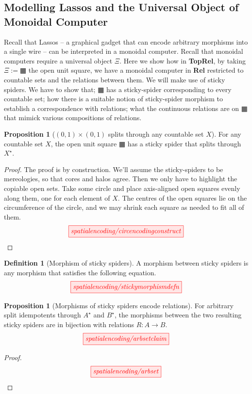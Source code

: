 \documentclass{tufte-handout}
\theoremstyle{definition}
\newtheorem{proposition}[theorem]{Proposition}
\newtheorem{defn}[theorem]{Definition}
\begin{document}
\begin{fullwidth}
\section{Modelling Lassos and the Universal Object of Monoidal Computer}

Recall that Lassos -- a graphical gadget that can encode arbitrary morphisms into a single wire -- can be interpreted in a monoidal computer. Recall that monoidal computers require a universal object $\Xi$. Here we show how in \textbf{TopRel}, by taking $\Xi := \squarehvfill$ the open unit square, we have a monoidal computer in \textbf{Rel} restricted to countable sets and the relations between them. We will make use of sticky spiders. We have to show that; $\squarehvfill$ has a sticky-spider corresponding to every countable set; how there is a suitable notion of sticky-spider morphism to establish a correspondence with relations; what the continuous relations are on $\squarehvfill$ that mimick various compositions of relations.

\begin{proposition}[$(0,1) \times (0,1)$ splits through any countable set $X$]
For any countable set $X$, the open unit square $\squarehvfill$ has a sticky spider that splits through $X^\star$.
\begin{proof}
The proof is by construction. We'll assume the sticky-spiders to be mereologies, so that cores and halos agree. Then we only have to highlight the copiable open sets. Take some circle and place axis-aligned open squares evenly along them, one for each element of $X$. The centres of the open squares lie on the circumference of the circle, and we may shrink each square as needed to fit all of them.
\[\scalebox{1}{\tikzfig{spatialencoding/circencodingconstruct}}\]
\end{proof}
\end{proposition}

\begin{defn}[Morphism of sticky spiders]
A morphism between sticky spiders is any morphism that satisfies the following equation.
\[\scalebox{1}{\tikzfig{spatialencoding/stickymorphismdefn}}\]
\end{defn}

\begin{proposition}[Morphisms of sticky spiders encode relations]
For arbitrary split idempotents through $A^\star$ and $B^\star$, the morphisms between the two resulting sticky spiders are in bijection with relations $R: A \rightarrow B$.
\[\scalebox{1}{\tikzfig{spatialencoding/arbsetclaim}}\]
\begin{proof}
\[\scalebox{1}{\tikzfig{spatialencoding/arbset}}\]
\end{proof}
\end{proposition}


\end{fullwidth}
\end{document}
